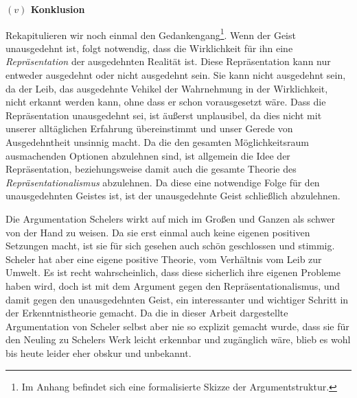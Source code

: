 \documentclass[a4paper, 12pt]{article}
\begin{document}
\begin{onehalfspace}




\vspace{5mm}
\noindent\textbf{$(v)$ Konklusion}

\noindent Rekapitulieren wir noch einmal den Gedankengang\footnote{Im Anhang befindet sich eine formalisierte Skizze der Argumentstruktur.}. Wenn der Geist unausgedehnt ist, folgt notwendig, dass die Wirklichkeit für ihn eine \emph{Repräsentation} der ausgedehnten Realität ist. Diese Repräsentation kann nur entweder ausgedehnt oder nicht ausgedehnt sein. Sie kann nicht ausgedehnt sein, da der Leib, das ausgedehnte Vehikel der Wahrnehmung in der Wirklichkeit, nicht erkannt werden kann, ohne dass er schon vorausgesetzt wäre. Dass die Repräsentation unausgedehnt sei, ist äußerst unplausibel, da dies nicht mit unserer alltäglichen Erfahrung übereinstimmt und unser Gerede von Ausgedehntheit unsinnig macht. Da die den gesamten Möglichkeitsraum ausmachenden Optionen abzulehnen sind, ist allgemein die Idee der Repräsentation, beziehungsweise damit auch die gesamte Theorie des \emph{Repräsentationalismus} abzulehnen. Da diese eine notwendige Folge für den unausgedehnten Geistes ist, ist der unausgedehnte Geist schließlich abzulehnen.

Die Argumentation Schelers wirkt auf mich im Großen und Ganzen als schwer von der Hand zu weisen. Da sie erst einmal auch keine eigenen positiven Setzungen macht, ist sie für sich gesehen auch schön geschlossen und stimmig. Scheler hat aber eine eigene positive Theorie, vom Verhältnis vom Leib zur Umwelt. Es ist recht wahrscheinlich, dass diese sicherlich ihre eigenen Probleme haben wird, doch ist mit dem Argument gegen den Repräsentationalismus, und damit gegen den unausgedehnten Geist, ein interessanter und wichtiger Schritt in der Erkenntnistheorie gemacht. Da die in dieser Arbeit dargestellte Argumentation von Scheler selbst aber nie so explizit gemacht wurde, dass sie für den Neuling zu Schelers Werk leicht erkennbar und zugänglich wäre, blieb es wohl bis heute leider eher obskur und unbekannt. 




\end{onehalfspace}
\end{document}
